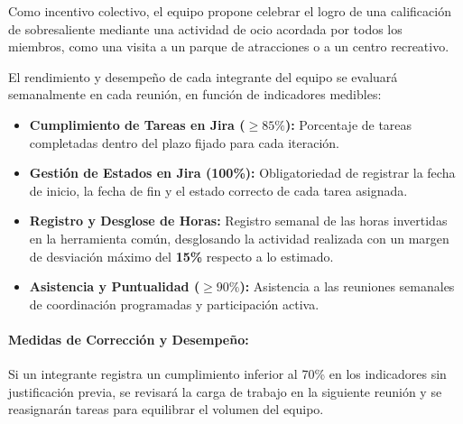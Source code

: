 Como incentivo colectivo, el equipo propone celebrar el logro de una calificación de sobresaliente mediante una actividad de ocio acordada por todos los miembros, como una visita a un parque de atracciones o a un centro recreativo.

El rendimiento y desempeño de cada integrante del equipo se evaluará semanalmente en cada reunión, en función de indicadores medibles:

\begin{itemize}
    \item \textbf{Cumplimiento de Tareas en Jira ($\ge 85\%$):} Porcentaje de tareas completadas dentro del plazo fijado para cada iteración.
    \item \textbf{Gestión de Estados en Jira (100\%):} Obligatoriedad de registrar la fecha de inicio, la fecha de fin y el estado correcto de cada tarea asignada.
    \item \textbf{Registro y Desglose de Horas:} Registro semanal de las horas invertidas en la herramienta común, desglosando la actividad realizada con un margen de desviación máximo del \textbf{15\%} respecto a lo estimado.
    \item \textbf{Asistencia y Puntualidad ($\ge 90\%$):} Asistencia a las reuniones semanales de coordinación programadas y participación activa.
\end{itemize}

\paragraph{Medidas de Corrección y Desempeño:}
Si un integrante registra un cumplimiento inferior al 70\% en los indicadores sin justificación previa, se revisará la carga de trabajo en la siguiente reunión y se reasignarán tareas para equilibrar el volumen del equipo.
